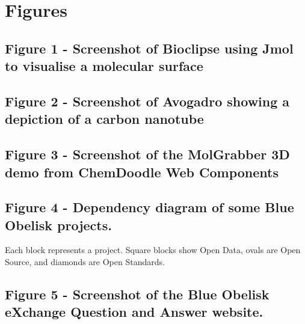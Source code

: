\documentclass[10pt]{bmc_article}
\newenvironment{bmcformat}{\fussy\setboolean{publ}{true}}{\fussy}
\begin{document}
\begin{bmcformat}
{
   }     %





\section*{Figures}

 \subsection*{Figure 1 - Screenshot of Bioclipse using Jmol to
visualise a molecular surface}

 \subsection*{Figure 2 - Screenshot of Avogadro showing a depiction of
a carbon nanotube}

 \subsection*{Figure 3 - Screenshot of the MolGrabber 3D demo from
ChemDoodle Web Components}

  \subsection*{Figure 4 - Dependency diagram of some Blue Obelisk projects.}
Each block represents a project. Square blocks show Open Data, ovals are Open Source,
and diamonds are Open Standards.

  \subsection*{Figure 5 - Screenshot of the Blue Obelisk eXchange Question
    and Answer website.}



\end{bmcformat}
\end{document}
